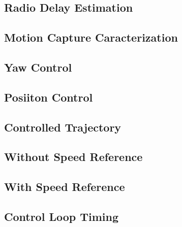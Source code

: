 \documentclass[a4paper, 12pt]{report}
\begin{document}
\cite{Arkin1999}
\cite{Mataric2002}

\subsection{Radio Delay Estimation}
\subsection{Motion Capture Caracterization}
\subsection{Yaw Control}
\subsection{Posiiton Control}
\subsection{Controlled Trajectory}
\subsection{Without Speed Reference}
\subsection{With Speed Reference}
\subsection{Control Loop Timing}
\end{document}
